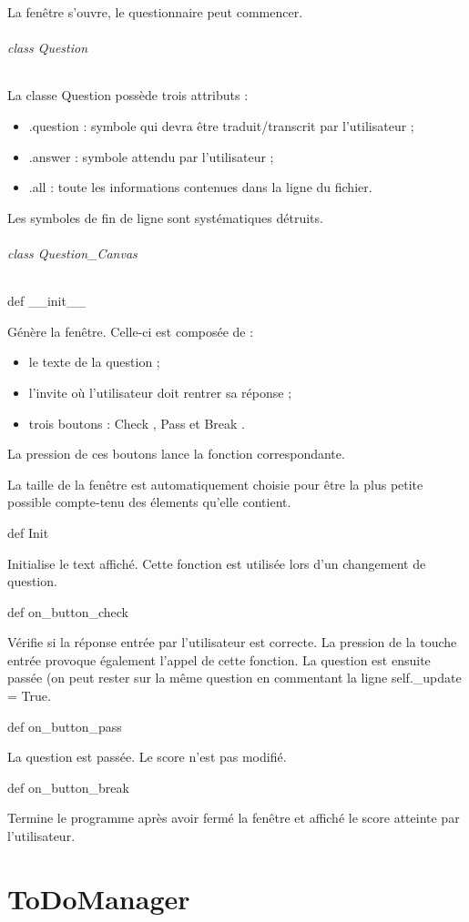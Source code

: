 \documentclass[a4paper,12pt]{article}
\begin{document}
La fenêtre s'ouvre, le questionnaire peut commencer. 
\paragraph{class Question}
La classe Question possède trois attributs :
\begin{itemize}
\item .question : symbole qui devra être traduit/transcrit par l'utilisateur ;
\item .answer : symbole attendu par l'utilisateur ;
\item .all : toute les informations contenues dans la ligne du fichier.
\end{itemize}

Les symboles de fin de ligne sont systématiques détruits.
\paragraph{class Question\_Canvas}
\subparagraph{def \_\_init\_\_}
Génère la fenêtre. Celle-ci est composée de :
\begin{itemize}
\item le texte de la question ;
\item l'invite où l'utilisateur doit rentrer sa réponse ;
\item trois boutons : \og Check \fg, \og Pass \fg{} et \og Break \fg.   
\end{itemize}

La pression de ces boutons lance la fonction correspondante.

La taille de la fenêtre est automatiquement choisie pour être la plus petite possible compte-tenu des élements qu'elle contient.
\subparagraph{def Init}
Initialise le text affiché. Cette fonction est utilisée lors d'un changement de question.
\subparagraph{def on\_button\_check}
Vérifie si la réponse entrée par l'utilisateur est correcte. La pression de la touche entrée provoque également l'appel de cette fonction. La question est ensuite passée (on peut rester sur la même question en commentant la ligne self.\_update = True.
\subparagraph{def on\_button\_pass}
La question est passée. Le score n'est pas modifié.

\subparagraph{def on\_button\_break}
Termine le programme après avoir fermé la fenêtre et affiché le score atteinte par l'utilisateur.
\part{ToDoManager}
\end{document}
